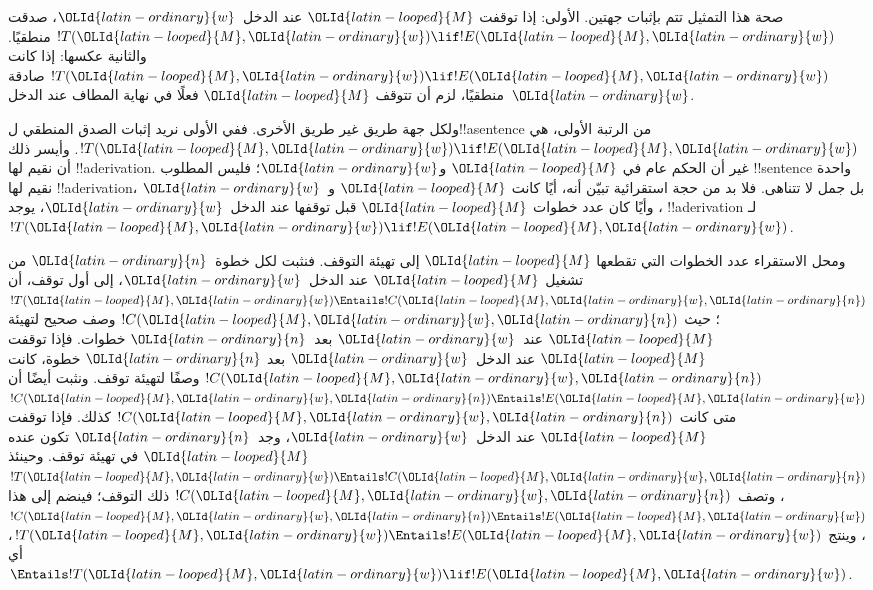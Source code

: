 \documentclass[../../../include/open-logic-section]{subfiles}
\begin{document}

\begin{explain}
صحة هذا التمثيل تتم بإثبات جهتين. الأولى: إذا توقفت $\OLId{latin-looped}{M}$ عند
الدخل~$\OLId{latin-ordinary}{w}$، صدقت $!T(\OLId{latin-looped}{M},\OLId{latin-ordinary}{w})\lif !E(\OLId{latin-looped}{M},\OLId{latin-ordinary}{w})$ منطقيًا. والثانية عكسها:
إذا كانت $!T(\OLId{latin-looped}{M},\OLId{latin-ordinary}{w})\lif !E(\OLId{latin-looped}{M},\OLId{latin-ordinary}{w})$ صادقة منطقيًا، لزم أن تتوقف
$\OLId{latin-looped}{M}$ فعلًا في نهاية المطاف عند الدخل~$\OLId{latin-ordinary}{w}$.

ولكل جهة طريق غير طريق الأخرى. ففي الأولى نريد إثبات الصدق
المنطقي ل!!a{sentence} من الرتبة الأولى، هي
$!T(\OLId{latin-looped}{M},\OLId{latin-ordinary}{w})\lif !E(\OLId{latin-looped}{M},\OLId{latin-ordinary}{w})$. وأيسر ذلك أن نقيم لها !!a{derivation}.
غير أن الحكم عام في $\OLId{latin-looped}{M}$ و$\OLId{latin-ordinary}{w}$؛ فليس المطلوب !!{sentence}
واحدة نقيم لها !!a{derivation}، بل جمل لا تتناهى. فلا بد من
حجة استقرائية تبيّن أنه، أيًا كانت $\OLId{latin-looped}{M}$ و~$\OLId{latin-ordinary}{w}$، وأيًا كان عدد
خطوات $\OLId{latin-looped}{M}$ قبل توقفها عند الدخل~$\OLId{latin-ordinary}{w}$، يوجد !!a{derivation}
لـ$!T(\OLId{latin-looped}{M},\OLId{latin-ordinary}{w})\lif !E(\OLId{latin-looped}{M},\OLId{latin-ordinary}{w})$.

ومحل الاستقراء عدد الخطوات التي تقطعها $\OLId{latin-looped}{M}$ إلى تهيئة التوقف.
فنثبت لكل خطوة~$\OLId{latin-ordinary}{n}$ من تشغيل $\OLId{latin-looped}{M}$ عند الدخل~$\OLId{latin-ordinary}{w}$، إلى أول توقف،
أن $!T(\OLId{latin-looped}{M},\OLId{latin-ordinary}{w})\Entails !C(\OLId{latin-looped}{M},\OLId{latin-ordinary}{w},\OLId{latin-ordinary}{n})$؛ حيث $!C(\OLId{latin-looped}{M},\OLId{latin-ordinary}{w},\OLId{latin-ordinary}{n})$ وصف صحيح
لتهيئة $\OLId{latin-looped}{M}$ عند~$\OLId{latin-ordinary}{w}$ بعد~$\OLId{latin-ordinary}{n}$ خطوات. فإذا توقفت $\OLId{latin-looped}{M}$ عند
الدخل~$\OLId{latin-ordinary}{w}$ بعد $\OLId{latin-ordinary}{n}$ خطوة، كانت $!C(\OLId{latin-looped}{M},\OLId{latin-ordinary}{w},\OLId{latin-ordinary}{n})$ وصفًا لتهيئة توقف.
ونثبت أيضًا أن $!C(\OLId{latin-looped}{M},\OLId{latin-ordinary}{w},\OLId{latin-ordinary}{n})\Entails !E(\OLId{latin-looped}{M},\OLId{latin-ordinary}{w})$ متى كانت
$!C(\OLId{latin-looped}{M},\OLId{latin-ordinary}{w},\OLId{latin-ordinary}{n})$ كذلك. فإذا توقفت $\OLId{latin-looped}{M}$ عند الدخل~$\OLId{latin-ordinary}{w}$، وجد~$\OLId{latin-ordinary}{n}$
تكون عنده $\OLId{latin-looped}{M}$ في تهيئة توقف. وحينئذ
$!T(\OLId{latin-looped}{M},\OLId{latin-ordinary}{w})\Entails !C(\OLId{latin-looped}{M},\OLId{latin-ordinary}{w},\OLId{latin-ordinary}{n})$، وتصف $!C(\OLId{latin-looped}{M},\OLId{latin-ordinary}{w},\OLId{latin-ordinary}{n})$ ذلك التوقف؛
فينضم إلى هذا $!C(\OLId{latin-looped}{M},\OLId{latin-ordinary}{w},\OLId{latin-ordinary}{n})\Entails !E(\OLId{latin-looped}{M},\OLId{latin-ordinary}{w})$، وينتج
$!T(\OLId{latin-looped}{M},\OLId{latin-ordinary}{w})\Entails !E(\OLId{latin-looped}{M},\OLId{latin-ordinary}{w})$، أي
$\Entails !T(\OLId{latin-looped}{M},\OLId{latin-ordinary}{w})\lif !E(\OLId{latin-looped}{M},\OLId{latin-ordinary}{w})$.


\end{explain}
\end{document}
